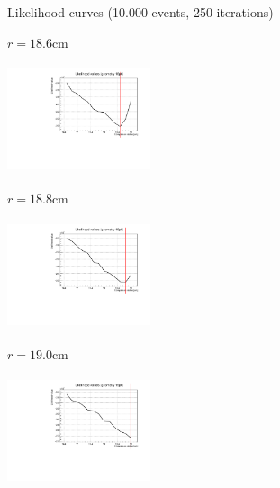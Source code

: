 \documentclass[8 pt]{beamer}
\begin{document}
\begin{frame}{Likelihood curves (10.000 events, 250 iterations)}
\vspace{-5pt}
\begin{minipage}[c]{.32\textwidth}
\begin{exampleblock}{} \begin{center}$r = 18.6$cm\end{center} \end{exampleblock}
\includegraphics[width=4.2cm, height=3.2cm]{figs/likelihood250LowStat/likelihood18p6.pdf} 
\end{minipage}
\begin{minipage}[c]{.32\textwidth}
\begin{exampleblock}{} \begin{center}$r = 18.8$cm\end{center} \end{exampleblock}
\includegraphics[width=4.2cm, height=3.2cm]{figs/likelihood250LowStat/likelihood18p8.pdf} 
\end{minipage}
\begin{minipage}[c]{.32\textwidth}
\begin{exampleblock}{} \begin{center}$r = 19.0$cm\end{center} \end{exampleblock}
\includegraphics[width=4.2cm, height=3.2cm]{figs/likelihood250LowStat/likelihood19p0.pdf} 
\end{minipage}
\end{frame}
\end{document}
